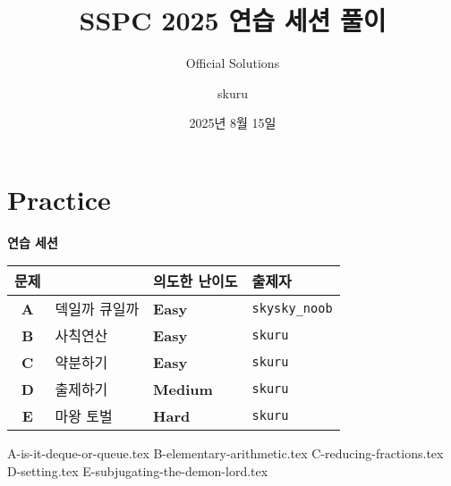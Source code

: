 
\usetikzlibrary{arrows.meta,matrix,decorations.pathreplacing}

\title{SSPC 2025 연습 세션 풀이}
\subtitle{Official Solutions}
\author{skuru}
\date{2025년 8월 15일}


\setcounter{framenumber}{-1}
\frame{\titlepage}

\section{Practice}
\begin{frame}
    {\huge {} \color{main-color} \textbf{연습 세션}}
    \vspace{3mm}
    \begin{center}
        \begin{tabular}{cl|l|l}
            \hline
            문제         &      & 의도한 난이도                         & 출제자            \\
            \hline
            \hline
            \textbf{A} & 덱일까 큐일까 & \textbf{\color{acbronze}Easy}   & \texttt{skysky\_noob} \\
            \textbf{B} & 사칙연산 & \textbf{\color{acbronze}Easy}   & \texttt{skuru} \\
            \textbf{C} & 약분하기 & \textbf{\color{acbronze}Easy}   & \texttt{skuru} \\
            \textbf{D} & 출제하기 & \textbf{\color{acgold}Medium} & \texttt{skuru} \\
            \textbf{E} & 마왕 토벌 & \textbf{\color{acplatinum}Hard} & \texttt{skuru} \\
            \hline
        \end{tabular}
    \end{center}
\end{frame}

{A-is-it-deque-or-queue.tex}
{B-elementary-arithmetic.tex}
{C-reducing-fractions.tex}
{D-setting.tex}
{E-subjugating-the-demon-lord.tex}

